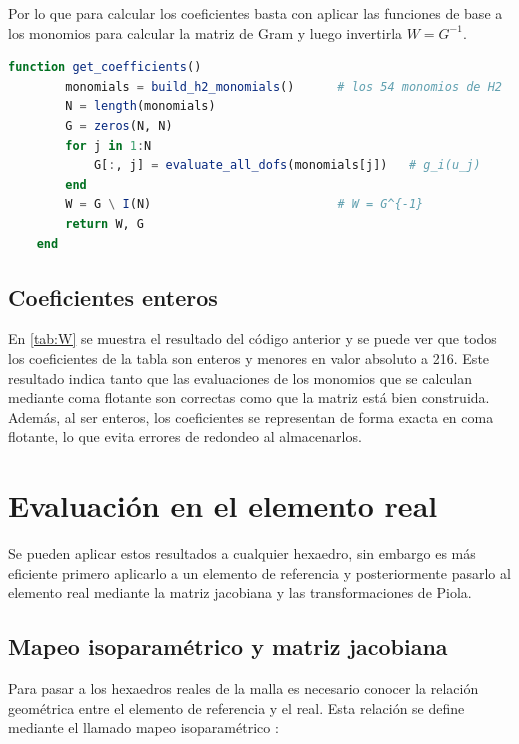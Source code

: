 \documentclass[12pt]{report} %
\begin{document}
Por lo que para calcular los coeficientes basta con aplicar las funciones de base a los monomios para calcular la matriz de Gram y luego invertirla $W = G^{-1}$.

\begin{lstlisting}[language=Julia, caption={Construcci\'on de la base dual $\mathbf{G}\mathbf{W}=\mathbf{I}$ a partir de los funcionales de la \autoref{sec:dofs}.}, label=cod:coeficientes]
	function get_coefficients()
	    monomials = build_h2_monomials()      # los 54 monomios de H2
	    N = length(monomials)
	    G = zeros(N, N)
	    for j in 1:N
	        G[:, j] = evaluate_all_dofs(monomials[j])   # g_i(u_j)
	    end
	    W = G \ I(N)                          # W = G^{-1}
	    return W, G
	end
\end{lstlisting}

\subsection{Coeficientes enteros}\label{subsec:coeficientes-enteros}
En \autoref{tab:W} se muestra el resultado del código anterior y se puede ver que todos los coeficientes de la tabla son enteros y menores en valor absoluto a 216. Este resultado indica tanto que las evaluaciones de los monomios que se calculan mediante coma flotante son correctas como que la matriz está bien construida. Además, al ser enteros, los coeficientes se representan de forma exacta en coma flotante, lo que evita errores de redondeo al almacenarlos.



\section{Evaluación en el elemento real}\label{sec:evaluacion}
Se pueden aplicar estos resultados a cualquier hexaedro, sin embargo es más eficiente primero aplicarlo a un elemento de referencia y posteriormente pasarlo al elemento real mediante la matriz jacobiana y las transformaciones de Piola.

\subsection{Mapeo isoparamétrico y matriz jacobiana}\label{sec:jacobiano}

Para pasar a los hexaedros reales de la malla es necesario conocer la relación geométrica entre el elemento de referencia y el real. Esta relación se define mediante el llamado mapeo isoparamétrico \cite{jin2015}:
\end{document}
